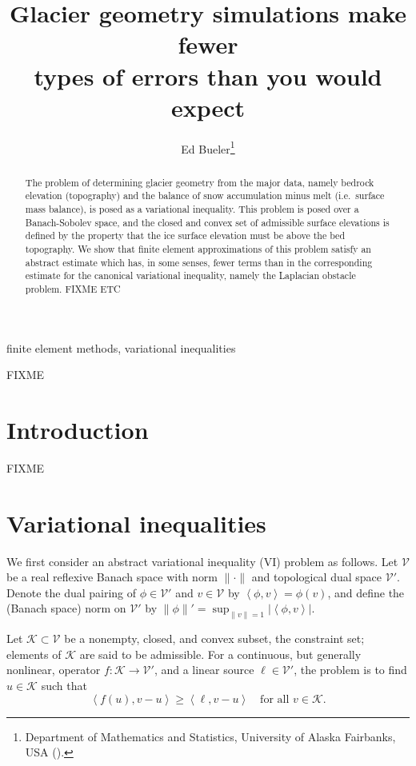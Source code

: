 \documentclass[hidelinks,onefignum,onetabnum,final]{siamart220329}  %
\title{Glacier geometry simulations make fewer \\ types of errors than you would expect}
\author{Ed Bueler\thanks{Department of Mathematics and Statistics, University of Alaska Fairbanks, USA
  (\email{elbueler@alaska.edu}).}}
\newcommand{\cK}{\mathcal{K}}
\newcommand{\cV}{\mathcal{V}}
\newcommand{\ip}[2]{\left<#1,#2\right>}
\begin{document}
\maketitle

\begin{abstract}
The problem of determining glacier geometry from the major data, namely bedrock elevation (topography) and the balance of snow accumulation minus melt (i.e.~surface mass balance), is posed as a variational inequality.  This problem is posed over a Banach-Sobolev space, and the closed and convex set of admissible surface elevations is defined by the property that the ice surface elevation must be above the bed topography.  We show that finite element approximations of this problem satisfy an abstract estimate which has, in some senses, fewer terms than in the corresponding estimate for the canonical variational inequality, namely the Laplacian obstacle problem.  FIXME ETC
\end{abstract}

\begin{keywords}
finite element methods, variational inequalities
\end{keywords}

\begin{MSCcodes}
FIXME
\end{MSCcodes}


\section{Introduction} \label{sec:intro}

FIXME


\section{Variational inequalities} \label{sec:vi}

We first consider an abstract variational inequality (VI) problem as follows.  Let $\cV$ be a real reflexive Banach space with norm $\|\cdot\|$ and topological dual space $\cV'$.  Denote the dual pairing of $\phi \in \cV'$ and $v\in\cV$ by $\ip{\phi}{v} = \phi(v)$, and define the (Banach space) norm on $\cV'$ by $\|\phi\|' = \sup_{\|v\|=1} |\!\ip{\phi}{v}\!|$.

Let $\cK \subset \cV$ be a nonempty, closed, and convex subset, the constraint set; elements of $\cK$ are said to be admissible.  For a continuous, but generally nonlinear, operator $f:\cK \to \cV'$, and a linear source $\ell\in \cV'$, the problem is to find $u\in \cK$ such that
\begin{equation}
\ip{f(u)}{v-u} \ge \ip{\ell}{v-u} \quad \text{for all } v\in \cK. \label{eq:vi}
\end{equation}
\end{document}
